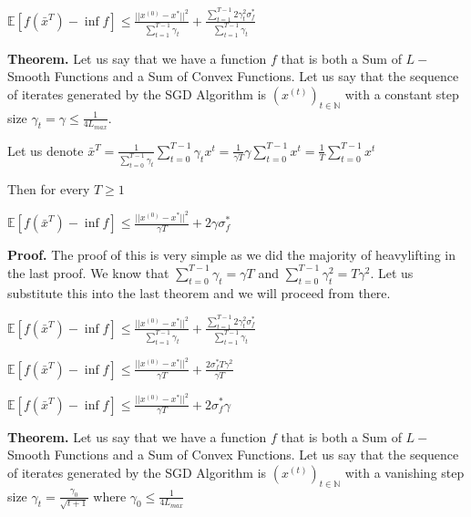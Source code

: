 $\mathbb{E} [f(\bar{x}^T) - \inf f] \leq \frac{||x^{(0)} - x^*||^2}{\sum_{t = 1}^{T - 1} \gamma_t} + \frac{\sum_{t=1}^{T - 1} 2 \gamma_t^2 \sigma_f^*}{\sum_{t = 1}^{T - 1} \gamma_t}$ \newline 

\noindent \textbf{Theorem.} Let us say that we have a function $f$ that is both a Sum of $L-$Smooth Functions and a Sum of Convex Functions. Let us say that the sequence of iterates generated by the SGD Algorithm is $(x^{(t)})_{t \in \mathbb{N}}$ with a constant step size $\gamma_t = \gamma \leq \frac{1}{4L_{max}}$.

Let us denote $\bar{x}^T = \frac{1}{\sum_{t = 0}^{T - 1} \gamma_t} \sum_{t = 0}^{T - 1} \gamma_t x^t = \frac{1}{\gamma T} \gamma \sum_{t = 0}^{T - 1} x^t = \frac{1}{T} \sum_{t = 0}^{T - 1} x^t$ \newline 

Then for every $T \geq 1$ \newline 

$\mathbb{E}[f(\bar{x}^T) - \inf f] \leq \frac{||x^{(0)} - x^*||^2}{\gamma T} + 2\gamma \sigma_f^* $ \newline 

\noindent \textbf{Proof.} The proof of this is very simple as we did the majority of heavylifting in the last proof. We know that $\sum_{t = 0}^{T - 1} \gamma_t = \gamma T$ and $\sum_{t = 0}^{T - 1} \gamma_t^2 = T\gamma^2$. Let us substitute this into the last theorem and we will proceed from there. 

$\mathbb{E} [f(\bar{x}^T) - \inf f] \leq \frac{||x^{(0)} - x^*||^2}{\sum_{t = 1}^{T - 1} \gamma_t} + \frac{\sum_{t=1}^{T - 1} 2 \gamma_t^2 \sigma_f^*}{\sum_{t = 1}^{T - 1} \gamma_t}$ \newline

$\mathbb{E} [f(\bar{x}^T) - \inf f] \leq \frac{||x^{(0)} - x^*||^2}{\gamma T} + \frac{2 \sigma_f^* T\gamma^2}{\gamma T}$ \newline

$\mathbb{E} [f(\bar{x}^T) - \inf f] \leq \frac{||x^{(0)} - x^*||^2}{\gamma T} + 2 \sigma_f^* \gamma$ \newline

\noindent \textbf{Theorem.} Let us say that we have a function $f$ that is both a Sum of $L-$Smooth Functions and a Sum of Convex Functions. Let us say that the sequence of iterates generated by the SGD Algorithm is $(x^{(t)})_{t \in \mathbb{N}}$ with a vanishing step size $\gamma_t = \frac{\gamma_0}{\sqrt{t + 1}}$ where $\gamma_0 \leq \frac{1}{4L_{max}}$ 

